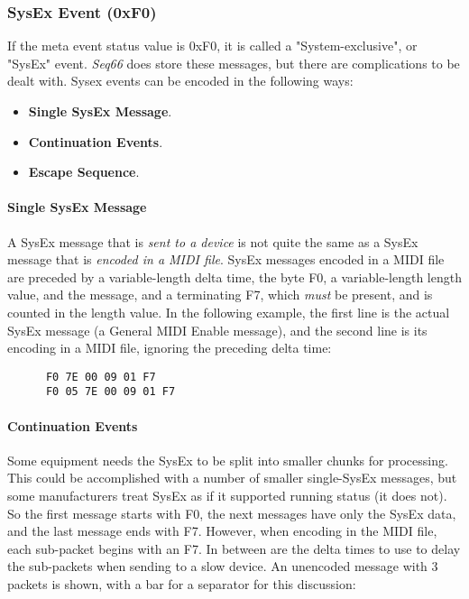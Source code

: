 \subsubsection{SysEx Event (0xF0)}
\label{subsubsec:midi_format_meta_sysex_event}

   If the meta event status value is 0xF0, it is called a "System-exclusive",
   or "SysEx" event.
   \textsl{Seq66} does store these messages, but there are complications
   to be dealt with.
   Sysex events can be encoded in the following ways:

   \begin{itemize}
      \item \textbf{Single SysEx Message}.
      \item \textbf{Continuation Events}.
      \item \textbf{Escape Sequence}.
   \end{itemize}

\paragraph{Single SysEx Message}
\label{paragraph:patterns_single_sysex_message}

   A SysEx message that is \textsl{sent to a device} is not quite the 
   same as a SysEx message that is \textsl{encoded in a MIDI file}.
   SysEx messages encoded in a MIDI file
   are preceded by a variable-length delta time, the byte F0,
   a variable-length length value, and the message, and a terminating F7,
   which \textsl{must} be present, and is counted in the length value.
   In the following example, the first line is the actual SysEx message
   (a General MIDI Enable message),
   and the second line is its encoding in a MIDI file, ignoring the preceding
   delta time:

   \begin{verbatim}
      F0 7E 00 09 01 F7
      F0 05 7E 00 09 01 F7
   \end{verbatim}

\paragraph{Continuation Events}
\label{paragraph:patterns_continuation_events}

   Some equipment needs the SysEx to be split into smaller chunks for
   processing.
   This could be accomplished with a number of smaller single-SysEx messages,
   but some manufacturers treat SysEx as if it supported running status (it
   does not).
   So the first message starts with F0, the next messages have only the SysEx
   data, and the last message ends with F7.
   However, when encoding in the MIDI file, each sub-packet begins with
   an F7.
   In between are the delta times to use to delay the sub-packets when sending
   to a slow device.
   An unencoded message with 3 packets is shown,
   with a bar for a separator for this discussion:

